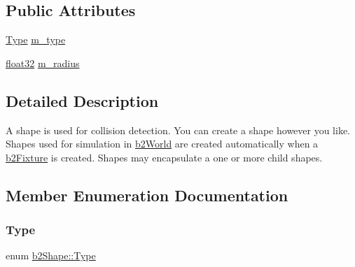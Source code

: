 \subsection*{Public Attributes}
\begin{DoxyCompactItemize}
\item 
\mbox{\hyperlink{classb2_shape_a4c1f3a9ad6b3150bb90ad9018ca4b1e0}{Type}} \mbox{\hyperlink{classb2_shape_adb051791133b24f53c6e9a565a7b7bbb}{m\+\_\+type}}
\item 
\mbox{\hyperlink{b2_settings_8h_aacdc525d6f7bddb3ae95d5c311bd06a1}{float32}} \mbox{\hyperlink{classb2_shape_a5de7a9bd3f9e72ef7025a65c304aaf1a}{m\+\_\+radius}}
\end{DoxyCompactItemize}


\subsection{Detailed Description}
A shape is used for collision detection. You can create a shape however you like. Shapes used for simulation in \mbox{\hyperlink{classb2_world}{b2\+World}} are created automatically when a \mbox{\hyperlink{classb2_fixture}{b2\+Fixture}} is created. Shapes may encapsulate a one or more child shapes. 

\subsection{Member Enumeration Documentation}
\mbox{\label{classb2_shape_a4c1f3a9ad6b3150bb90ad9018ca4b1e0}} 
\subsubsection{\texorpdfstring{Type}{Type}}
{\footnotesize\ttfamily enum \mbox{\hyperlink{classb2_shape_a4c1f3a9ad6b3150bb90ad9018ca4b1e0}{b2\+Shape\+::\+Type}}}

